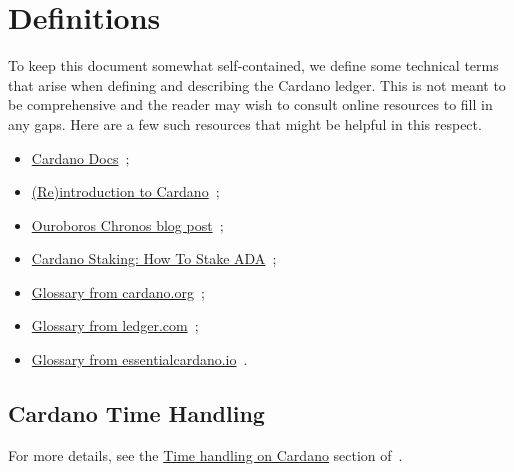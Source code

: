\section{Definitions}
\label{sec:definitions}
To keep this document somewhat self-contained, we define some technical terms that
arise when defining and describing the Cardano ledger.
This is not meant to be comprehensive and the reader may wish to consult
online resources to fill in any gaps.  Here are a few such resources that might be
helpful in this respect.

\begin{itemize}
  \item
        \href{https://docs.cardano.org/}%
             {Cardano Docs}~\cite{www-docs-cardano};
  \item
        \href{https://developers.cardano.org/docs/operate-a-stake-pool/introduction-to-cardano/}%
             {(Re)introduction to Cardano}~\cite{www-developers-cardano-reintro};
  \item
        \href{https://iohk.io/en/blog/posts/2021/10/27/ouroboros-chronos-provides-the-first-high-resilience-cryptographic-time-source-based-on-blockchain/}%
             {Ouroboros Chronos blog post}~\cite{www-iohk-blog-ouroboros};
  \item
        \href{https://www.ledger.com/academy/cardano-staking-how-to-stake-ada}%
             {Cardano Staking: How To Stake ADA}~\cite{www-ledger-academy-stake-ada};
  \item
        \href{https://cardano.org/docs/glossary#cardano-glossary}%
             {Glossary from cardano.org}~\cite{www-cardano-glossary};
  \item
        \href{https://www.ledger.com/academy/glossary}%
             {Glossary from ledger.com}~\cite{www-ledger-academy-glossary};
  \item
        \href{https://www.essentialcardano.io/glossary?sort=alphabetical}%
             {Glossary from essentialcardano.io}~\cite{www-essential-cardano-glossary}.
\end{itemize}

\subsection{Cardano Time Handling}
\label{sec:cardano-time-handling}

For more details, see the
\href{https://docs.cardano.org/about-cardano/explore-more/time}%
     {Time handling on Cardano} section of~\cite{www-docs-cardano-time}.

